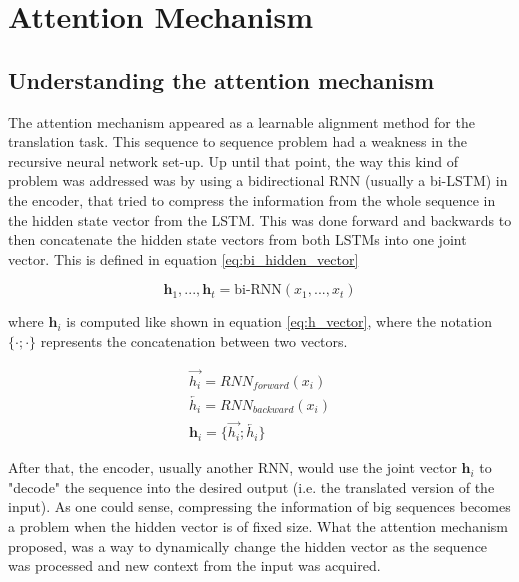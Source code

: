 \chapter{Attention Mechanism}

\section{Understanding the attention mechanism}
\label{app:attention-mec}

The attention mechanism appeared as a learnable alignment method for the translation task. This sequence to sequence problem had a weakness in the recursive neural network set-up. Up until that point, the way this kind of problem was addressed was by using a bidirectional RNN (usually a bi-LSTM) in the encoder, that tried to compress the information from the whole sequence in the hidden state vector from the LSTM. This was done forward and backwards to then concatenate the hidden state vectors from both LSTMs into one joint vector. This is defined in equation \ref{eq:bi_hidden_vector}

\begin{equation}
	\label{eq:bi_hidden_vector}
	\textbf{h}_1, ..., \textbf{h}_t = \text{bi-RNN}(x_1, ..., x_t)
\end{equation}

where $\textbf{h}_i$ is computed like shown in equation \ref{eq:h_vector}, where the notation $\{\cdot ; \cdot\}$ represents the concatenation between two vectors.

\begin{equation}
\begin{split}
	\label{eq:h_vector}
	\overrightarrow{h_i} = RNN_{forward}(x_i) \\
	\overleftarrow{h_i}  = RNN_{backward}(x_i) \\
	\textbf{h}_i = \{\overrightarrow{h_i};\overleftarrow{h_i}\}
\end{split}
\end{equation}

After that, the encoder, usually another RNN, would use the joint vector  $\textbf{h}_i$ to "decode" the sequence into the desired output (i.e.  the translated version of the input). As one could sense, compressing the information of big sequences becomes a problem when the hidden vector is of fixed size. What the attention mechanism proposed, was a way to dynamically change the hidden vector as the sequence was processed and new context from the input was acquired.

